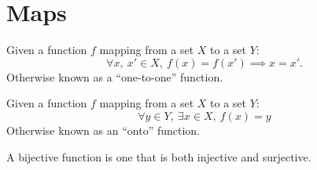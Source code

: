 \section{Maps}

\begin{definition}[Injective]
    \label{definition : Injective}
    \leanok
    Given a function \( f \) mapping from a set \( X \) to a set \( Y \):
    \[
        \forall x,~ x' \in X,~ f(x) = f(x') \implies x = x'.
    \]
    Otherwise known as a ``one-to-one'' function.
\end{definition}

\begin{definition}[Surjective]
    \label{definition : Surjective}
    \leanok
    Given a function \( f \) mapping from a set \( X \) to a set \( Y \):
    \[
        \forall y \in Y,~ \exists x \in X,~ f(x) = y
    \]
    Otherwise known as an ``onto'' function.
\end{definition}

\begin{definition}[Bijective]
    \label{definition : Bijective}
    \leanok
    A bijective function is one that is both injective and surjective.
\end{definition}

